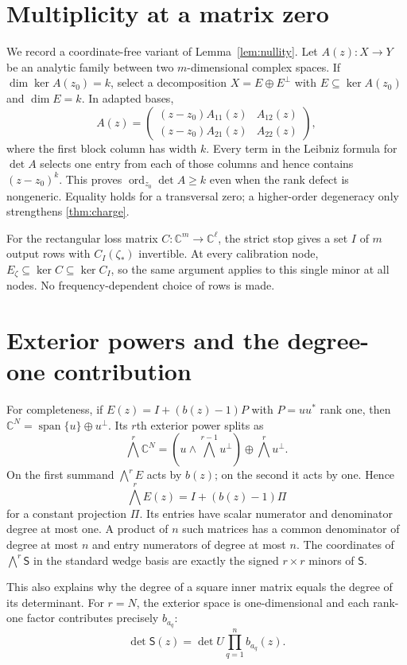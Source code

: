\documentclass[11pt]{article}
\theoremstyle{definition}
\theoremstyle{remark}
\newcommand{\C}{\mathbb{C}}
\newcommand{\ord}{\operatorname{ord}}
\begin{document}
\appendix

\section{Multiplicity at a matrix zero}

We record a coordinate-free variant of Lemma~\ref{lem:nullity}.  Let
$A(z):X\to Y$ be an analytic family between two $m$-dimensional complex
spaces.  If $\dim\ker A(z_0)=k$, select a decomposition
$X=E\oplus E^\perp$ with $E\subseteq\ker A(z_0)$ and $\dim E=k$.  In adapted
bases,
\[
 A(z)=\begin{pmatrix}
  (z-z_0)A_{11}(z)&A_{12}(z)\\
  (z-z_0)A_{21}(z)&A_{22}(z)
 \end{pmatrix},
\]
where the first block column has width $k$.  Every term in the Leibniz
formula for $\det A$ selects one entry from each of those columns and hence
contains $(z-z_0)^k$.  This proves
$\ord_{z_0}\det A\geq k$ even when the rank defect is nongeneric.  Equality
holds for a transversal zero; a higher-order degeneracy only strengthens
\cref{thm:charge}.

For the rectangular loss matrix $C:\C^m\to\C^\ell$, the strict stop gives a
set $I$ of $m$ output rows with $C_I(\zeta_*)$ invertible.  At every
calibration node, $E_\zeta\subseteq\ker C\subseteq\ker C_I$, so the same
argument applies to this single minor at all nodes.  No frequency-dependent
choice of rows is made.

\section{Exterior powers and the degree-one contribution}

For completeness, if $E(z)=I+(b(z)-1)P$ with $P=uu^*$ rank one, then
$\C^N=\operatorname{span}\{u\}\oplus u^\perp$.  Its $r$th exterior power
splits as
\[
 \bigwedge^r\C^N=
 \left(u\wedge\bigwedge^{r-1}u^\perp\right)
 \oplus \bigwedge^r u^\perp.
\]
On the first summand $\bigwedge^rE$ acts by $b(z)$; on the second it acts by
one.  Hence
\[
 \bigwedge^rE(z)=I+(b(z)-1)\Pi
\]
for a constant projection $\Pi$.  Its entries have scalar numerator and
denominator degree at most one.  A product of $n$ such matrices has a common
denominator of degree at most $n$ and entry numerators of degree at most $n$.
The coordinates of $\bigwedge^r\mathsf S$ in the standard wedge basis are
exactly the signed $r\times r$ minors of $\mathsf S$.

This also explains why the degree of a square inner matrix equals the degree
of its determinant.  For $r=N$, the exterior space is one-dimensional and
each rank-one factor contributes precisely $b_{a_q}$:
\[
 \det\mathsf S(z)=\det U\prod_{q=1}^{n}b_{a_q}(z).
\]
\end{document}
